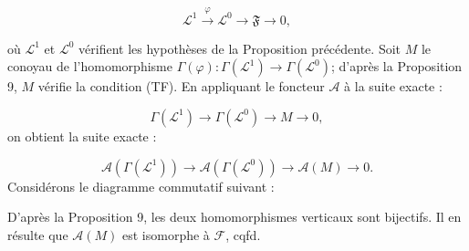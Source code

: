 \begin{equation*}
\mathcal{L}^{1} \stackrel{\varphi}{\longrightarrow} \mathcal{L}^{0} \to \mathfrak{F} \to 0,
\end{equation*}


 où $\mathcal{L}^1$ et $\mathcal{L}^0$ vérifient les hypothèses de la Proposition précédente. Soit $M$ le conoyau de l'homomorphisme $\Gamma(\varphi): \Gamma(\mathcal{L}^1) \to \Gamma(\mathcal{L}^0)$; d'après la Proposition 9, $M$ vérifie la condition (TF). En appliquant le foncteur $\mathcal{A}$ à la suite exacte :

\begin{equation*}
\Gamma(\mathcal{L}^1) \to \Gamma(\mathcal{L}^0) \to M \to 0,
\end{equation*}
on obtient la suite exacte :

\begin{equation*}
\mathcal{A}(\Gamma(\mathcal{L}^1)) \to \mathcal{A}(\Gamma(\mathcal{L}^0)) \to \mathcal{A}(M) \to 0.
\end{equation*}
Considérons le diagramme commutatif suivant :

\begin{center}
\end{center}
D'après la Proposition 9, les deux homomorphismes verticaux sont bijectifs. Il en résulte que $\mathcal{A}(M)$ est isomorphe à $\mathcal{F}$, cqfd.


